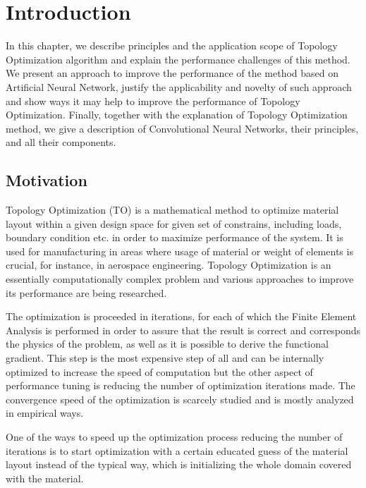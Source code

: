 
\chapter{Introduction}
\label{chapter:Introduction}

In this chapter, we describe principles and the application scope of Topology Optimization algorithm and explain the performance challenges of this method.
We present an approach to improve the performance of the method based on Artificial Neural Network, justify the applicability and novelty of such approach and show ways it may help to improve the performance of Topology Optimization. 
Finally, together with the explanation of Topology Optimization method, we give a description of Convolutional Neural Networks, their principles, and all their components.


\section{Motivation}

Topology Optimization (TO) is a mathematical method to optimize material layout within a given design space for given set of constrains, including loads, boundary condition etc. in order to maximize performance of the system.
It is used for manufacturing in areas where usage of material or weight of elements is crucial, for instance,  in aerospace engineering\cite{}.
Topology Optimization is an essentially computationally complex problem and various approaches to improve its performance are being researched.
\medskip

The optimization is proceeded in iterations, for each of which the Finite Element Analysis is performed in order to assure that the result is correct and corresponds the physics of the problem, as well as it is possible to derive the functional gradient.
This step is the most expensive step of all and can be internally optimized to increase the speed of computation but the other aspect of performance tuning is reducing the number of optimization iterations made.
The convergence speed of the optimization is scarcely studied and is mostly analyzed in empirical ways.
\medskip

One of the ways to speed up the optimization process reducing the number of iterations is to start optimization with a certain educated guess of the material layout instead of the typical way, which is initializing the whole domain covered with the material.

